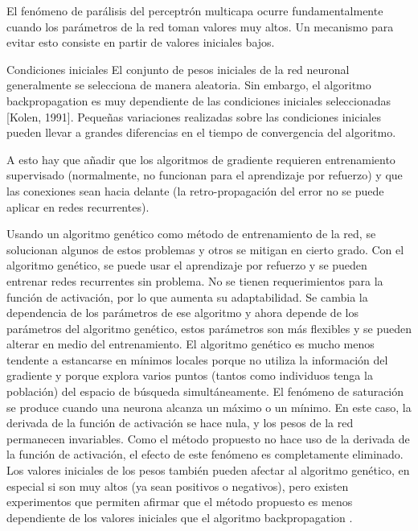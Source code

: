 \documentclass[a4paper,11pt]{article}
\newcommand{\definicion}[1]{%
	\bfseries{\textbullet #1:}
}
\newenvironment{listaDefiniciones}%
{
\begin{list}{}%
     {  \setlength{\itemsep}{0.5ex}
	\setlength{\parsep}{0.5ex}
	\setlength{\partopsep}{0.5ex}
	\setlength{\topsep}{\dimexpr 2\itemsep}
	\setlength{\listparindent}{\dimexpr \parindent}
	\renewcommand*{\makelabel}[1]{\definicion{##1}}
	}
}
{
\end{list}
}%
\begin{document}
\begin{listaDefiniciones}
 El fen\'omeno de par\'alisis del perceptr\'on multicapa ocurre fundamentalmente cuando los par\'ametros de la red toman valores muy altos. Un mecanismo para
evitar esto consiste en partir de valores iniciales bajos.

\item [Condiciones iniciales] El conjunto de pesos iniciales de la red neuronal generalmente se selecciona de manera aleatoria. Sin embargo, el algoritmo backpropagation es muy dependiente de las condiciones iniciales seleccionadas [Kolen, 1991]. Peque\~nas variaciones realizadas sobre las condiciones iniciales pueden llevar a grandes diferencias en el tiempo de convergencia del algoritmo.
\end{listaDefiniciones}

 A esto hay que a\~nadir que los algoritmos de gradiente requieren entrenamiento supervisado (normalmente, no funcionan para el aprendizaje por refuerzo) y que las conexiones sean hacia delante (la retro-propagaci\'on del error no se puede aplicar en redes recurrentes). 

 Usando un algoritmo gen\'etico como m\'etodo de entrenamiento de la red, se solucionan algunos de estos problemas y otros se mitigan en cierto grado. Con el algoritmo gen\'etico, se puede usar el aprendizaje por refuerzo y se pueden entrenar redes recurrentes sin problema. No se tienen requerimientos para la funci\'on de activaci\'on, por lo que aumenta su adaptabilidad. Se cambia la dependencia de los par\'ametros de ese algoritmo y ahora depende de los par\'ametros del algoritmo gen\'etico, estos par\'ametros son m\'as flexibles y se pueden alterar en medio del entrenamiento. El algoritmo gen\'etico es mucho menos tendente a estancarse en m\'inimos locales porque no utiliza la informaci\'on del gradiente y porque explora varios puntos (tantos como individuos tenga la poblaci\'on) del espacio de b\'usqueda simult\'aneamente. El fen\'omeno de saturaci\'on se produce cuando una neurona alcanza un m\'aximo o un m\'inimo. En este caso, la derivada de la funci\'on de activaci\'on se hace nula, y los pesos de la red permanecen invariables. Como el m\'etodo propuesto no hace uso de la derivada de la funci\'on de activaci\'on, el efecto de este fen\'omeno es completamente eliminado. Los valores iniciales de los pesos tambi\'en pueden afectar al algoritmo gen\'etico, en especial si son muy altos (ya sean positivos o negativos), pero existen experimentos que permiten afirmar que el m\'etodo propuesto es menos dependiente de los valores iniciales que el algoritmo backpropagation \cite[Bertona2005]{Bertona2005}.
\end{document}
